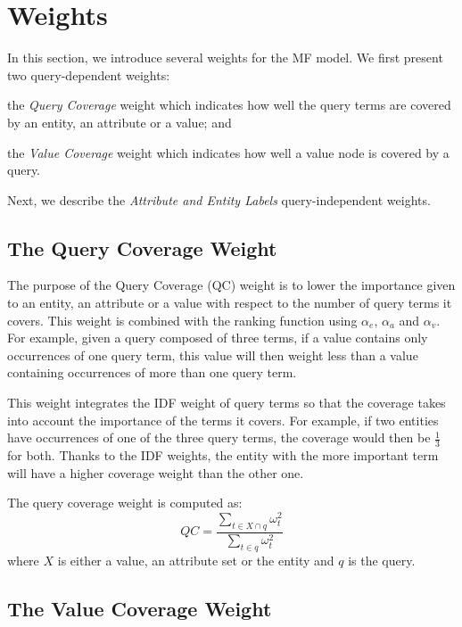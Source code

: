 \section{Weights}
\label{sec:weights}

In this section, we introduce several weights for the MF model. We first present two query-dependent weights: 
\begin{inparaenum}[(1)]
  \item the \emph{Query Coverage} weight which indicates how well the query terms are covered by an entity, an attribute or a value; and
  \item the \emph{Value Coverage} weight which indicates how well a value node is covered by a query.
\end{inparaenum}
Next, we describe the \emph{Attribute and Entity Labels} query-independent weights.

\subsection{The Query Coverage Weight}
\label{sec:kw-factor}

The purpose of the Query Coverage (QC) weight is to lower the importance given to an entity, an attribute or a value with respect to the number of query terms it covers. This weight is combined with the ranking function using $\alpha_e$, $\alpha_a$ and $\alpha_v$. For example, given a query composed of three terms, if a value contains only occurrences of one query term, this value will then weight less than a value containing occurrences of more than one query term.

This weight integrates the IDF weight of query terms so that the coverage takes into account the importance of the terms it covers. For example, if two entities have occurrences of one of the three query terms, the coverage would then be $\frac{1}{3}$ for both. Thanks to the IDF weights, the entity with the more important term will have a higher coverage weight than the other one.

The query coverage weight is computed as:
$$
QC = \frac{\sum_{t\in X \cap q}{\omega_t^2}}{\sum_{t\in q}{\omega_t^2}}
$$
where $X$ is either a value, an attribute set or the entity and $q$ is the query.

\subsection{The Value Coverage Weight}
\label{sec:coverage}

